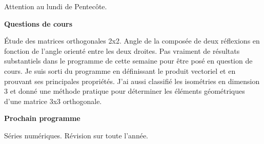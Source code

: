 





Attention au lundi de Pentecôte.




\bigskip
\begin{center}
 \textbf{Questions de cours}
\end{center}
\'Etude des matrices orthogonales 2x2. Angle de la composée de deux réflexions en fonction de l'angle orienté entre les deux droites. Pas vraiment de résultats substantiels dans le programme de cette semaine pour être posé en question de cours. Je suis sorti du programme en définissant le produit vectoriel et en prouvant ses principales propriétés. J'ai aussi classifié les isométries en dimension 3 et donné une méthode pratique pour déterminer les éléments géométriques d'une matrice 3x3 orthogonale.
\begin{center}
 \textbf{Prochain programme}
\end{center}
Séries numériques.
Révision sur toute l'année.

